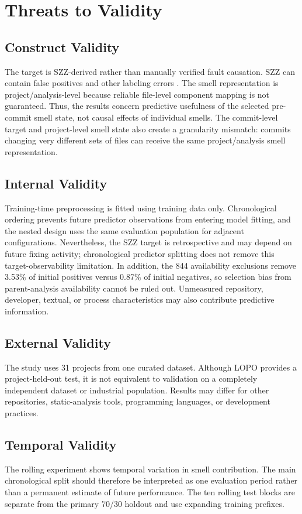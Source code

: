 \documentclass[conference]{IEEEtran}
\begin{document}
\section{Threats to Validity}
\subsection{Construct Validity}
The target is SZZ-derived rather than manually verified fault causation. SZZ can contain false positives and other labeling errors \cite{campos2019szz}. The smell representation is project/analysis-level because reliable file-level component mapping is not guaranteed. Thus, the results concern predictive usefulness of the selected pre-commit smell state, not causal effects of individual smells. The commit-level target and project-level smell state also create a granularity mismatch: commits changing very different sets of files can receive the same project/analysis smell representation.

\subsection{Internal Validity}
Training-time preprocessing is fitted using training data only. Chronological ordering prevents future predictor observations from entering model fitting, and the nested design uses the same evaluation population for adjacent configurations. Nevertheless, the SZZ target is retrospective and may depend on future fixing activity; chronological predictor splitting does not remove this target-observability limitation. In addition, the 844 availability exclusions remove 3.53\% of initial positives versus 0.87\% of initial negatives, so selection bias from parent-analysis availability cannot be ruled out. Unmeasured repository, developer, textual, or process characteristics may also contribute predictive information.

\subsection{External Validity}
The study uses 31 projects from one curated dataset. Although LOPO provides a project-held-out test, it is not equivalent to validation on a completely independent dataset or industrial population. Results may differ for other repositories, static-analysis tools, programming languages, or development practices.

\subsection{Temporal Validity}
The rolling experiment shows temporal variation in smell contribution. The main chronological split should therefore be interpreted as one evaluation period rather than a permanent estimate of future performance. The ten rolling test blocks are separate from the primary 70/30 holdout and use expanding training prefixes.
\end{document}
